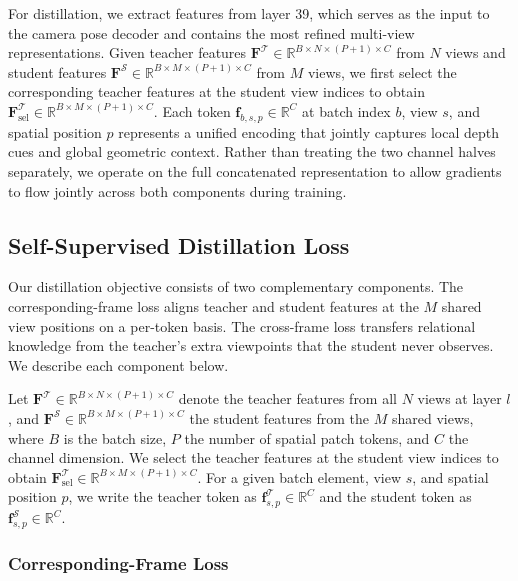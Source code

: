 For distillation, we extract features from layer 39, which serves as the input to the camera pose decoder and contains the most refined multi-view representations. Given teacher features $\mathbf{F}^{\mathcal{T}} \in \mathbb{R}^{B \times N \times (P+1) \times C}$ from $N$ views and student features $\mathbf{F}^{\mathcal{S}} \in \mathbb{R}^{B \times M \times (P+1) \times C}$ from $M$ views, we first select the corresponding teacher features at the student view indices to obtain $\mathbf{F}^{\mathcal{T}}_{\text{sel}} \in \mathbb{R}^{B \times M \times (P+1) \times C}$. Each token $\mathbf{f}_{b,s,p} \in \mathbb{R}^{C}$ at batch index $b$, view $s$, and spatial position $p$ represents a unified encoding that jointly captures local depth cues and global geometric context. Rather than treating the two channel halves separately, we operate on the full concatenated representation to allow gradients to flow jointly across both components during training.

\subsection{Self-Supervised Distillation Loss}

Our distillation objective consists of two complementary components. The corresponding-frame loss aligns teacher and student features at the $M$ shared view positions on a per-token basis. The cross-frame loss transfers relational knowledge from the teacher's extra viewpoints that the student never observes. We describe each component below.

Let $\mathbf{F}^{\mathcal{T}} \in \mathbb{R}^{B \times N \times (P+1) \times C}$ denote the teacher features from all $N$ views at layer $l$, and $\mathbf{F}^{\mathcal{S}} \in \mathbb{R}^{B \times M \times (P+1) \times C}$ the student features from the $M$ shared views, where $B$ is the batch size, $P$ the number of spatial patch tokens, and $C$ the channel dimension. We select the teacher features at the student view indices to obtain $\mathbf{F}^{\mathcal{T}}_{\text{sel}} \in \mathbb{R}^{B \times M \times (P+1) \times C}$. For a given batch element, view $s$, and spatial position $p$, we write the teacher token as $\mathbf{f}^{\mathcal{T}}_{s,p} \in \mathbb{R}^{C}$ and the student token as $\mathbf{f}^{\mathcal{S}}_{s,p} \in \mathbb{R}^{C}$.

\subsubsection{Corresponding-Frame Loss}

